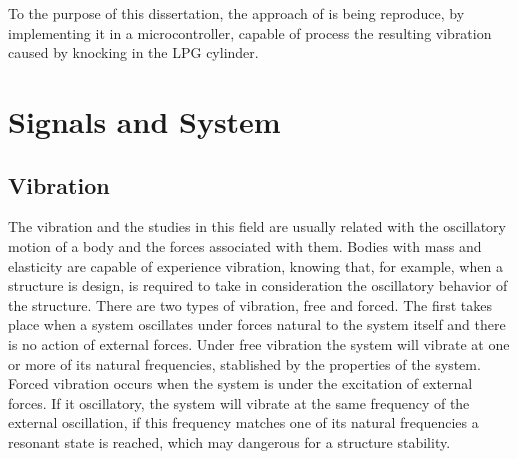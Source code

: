 To the purpose of this dissertation, the approach of \citeauthor{wuAnalysisImplementationNoncontact2016a} is being reproduce, by implementing it in a microcontroller, capable of process the resulting vibration caused by knocking in the LPG cylinder. 






\section{Signals and System}
\subsection{Vibration}
The vibration and the studies in this field are usually related with the oscillatory motion of a body and the forces associated with them. Bodies with mass and elasticity are capable of experience vibration, knowing that, for example, when a structure is design, is required to take in consideration the oscillatory behavior of the structure. There are two types of vibration, free and forced. The first takes place when a system oscillates under forces natural to the system itself and there is no action of external forces. Under free vibration the system will vibrate at one or more of its natural frequencies, stablished by the properties of the system. Forced vibration occurs when the system is under the excitation of external forces. If it oscillatory, the system will vibrate at the same frequency of the external oscillation, if this frequency matches one of its natural frequencies a resonant state is reached, which may dangerous for a structure stability.   

